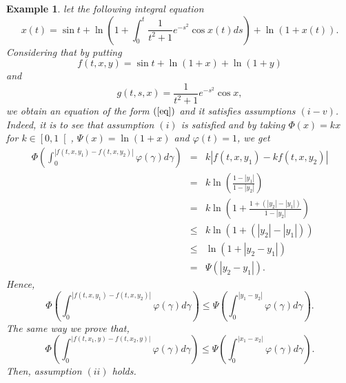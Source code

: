 \documentclass{amsart}
\theoremstyle{plain}
\newtheorem{example}{Example}
\numberwithin{equation}{section}
\begin{document}
\begin{example}
let the following integral equation\begin{equation}
x\left( t\right) =\sin t+\ln \left( 1+\int_{0}^{t}\frac{1}{t^{2}+1}e^{-s^{2}}\cos x\left( t\right) ds\right) +\ln \left( 1+x\left( t\right)
\right) .  \label{exple}
\end{equation}Considering that by putting\begin{equation*}
f\left( t,x,y\right) =\sin t+\ln \left( 1+x\right) +\ln \left( 1+y\right)
\end{equation*}and\begin{equation*}
g\left( t,s,x\right) =\frac{1}{t^{2}+1}e^{-s^{2}}\cos x,
\end{equation*}we obtain an equation of the form $\left( \text{\ref{eq}}\right) $ and it
satisfies assumptions $\left( i-v\right) $. Indeed, it is to see that
assumption $\left( i\right) $ is satisfied and by taking $\Phi \left(
x\right) =kx$ for $k\in \left[ 0,1\right[ $, $\Psi \left( x\right) =\ln
\left( 1+x\right) $ and $\varphi \left( t\right) =1$, we get\begin{eqnarray*}
\Phi \left( \int_{0}^{\left\vert f\left( t,x,y_{1}\right) -f\left(
t,x,y_{2}\right) \right\vert }\varphi \left( \gamma \right) d\gamma \right)
&=&k\left\vert f\left( t,x,y_{1}\right) -kf\left( t,x,y_{2}\right)
\right\vert \\
&=&k\ln \left( \frac{1-\left\vert y_{1}\right\vert }{1-\left\vert
y_{2}\right\vert }\right) \\
&=&k\ln \left( 1+\frac{1+\left( \left\vert y_{2}\right\vert -\left\vert
y_{1}\right\vert \right) }{1-\left\vert y_{2}\right\vert }\right) \\
&\leqslant &k\ln \left( 1+\left( \left\vert y_{2}\right\vert -\left\vert
y_{1}\right\vert \right) \right) \\
&\leqslant &\ln \left( 1+\left\vert y_{2}-y_{1}\right\vert \right) \\
&=&\Psi \left( \left\vert y_{2}-y_{1}\right\vert \right) .
\end{eqnarray*}Hence,\begin{equation*}
\Phi \left( \int_{0}^{\left\vert f\left( t,x,y_{1}\right) -f\left(
t,x,y_{2}\right) \right\vert }\varphi \left( \gamma \right) d\gamma \right)
\leqslant \Psi \left( \int_{0}^{\left\vert y_{1}-y_{2}\right\vert }\varphi
\left( \gamma \right) d\gamma \right) .
\end{equation*}The same way we prove that,\begin{equation*}
\Phi \left( \int_{0}^{\left\vert f\left( t,x_{1},y\right) -f\left(
t,x_{2},y\right) \right\vert }\varphi \left( \gamma \right) d\gamma \right)
\leqslant \Psi \left( \int_{0}^{\left\vert x_{1}-x_{2}\right\vert }\varphi
\left( \gamma \right) d\gamma \right) .
\end{equation*}Then, assumption $\left( ii\right) $ holds.


\end{example}
\end{document}
